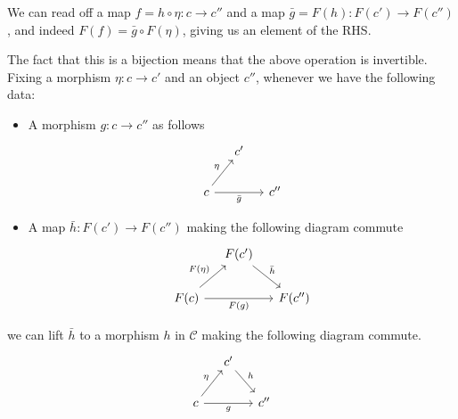 \documentclass[main.tex]{subfiles}
\begin{document}
We can read off a map $f = h \circ \eta\colon c \to c''$ and a map $\bar{g} = F(h)\colon F(c') \to F(c'')$, and indeed $F(f) = \bar{g} \circ F(\eta)$, giving us an element of the RHS.

The fact that this is a bijection means that the above operation is invertible. Fixing a morphism $\eta\colon c \to c'$ and an object $c''$, whenever we have the following data:
\begin{itemize}
  \item A morphism $g\colon c \to c''$ as follows
    \begin{equation*}
      \begin{tikzcd}[column sep=small]
        & c'
        \\
        c
        \arrow[ur, "\eta"]
        \arrow[rr, swap, "\bar{g}"]
        && c''
      \end{tikzcd}
    \end{equation*}
  \item A map $\bar{h}\colon F(c') \to F(c'')$ making the following diagram commute
    \begin{equation*}
      \begin{tikzcd}[column sep=small]
        & F(c')
        \arrow[dr, "\bar{h}"]
        \\
        F(c)
        \arrow[ur, "F(\eta)"]
        \arrow[rr, swap, "F(g)"]
        && F(c'')
      \end{tikzcd}
    \end{equation*}
\end{itemize}
we can lift $\bar{h}$ to a morphism $h$ in $\mathcal{C}$ making the following diagram commute.
\begin{equation*}
  \begin{tikzcd}[column sep=small]
    & c'
    \arrow[dr, "h"]
    \\
    c
    \arrow[ur, "\eta"]
    \arrow[rr, swap, "g"]
    && c''
  \end{tikzcd}
\end{equation*}
\end{document}

